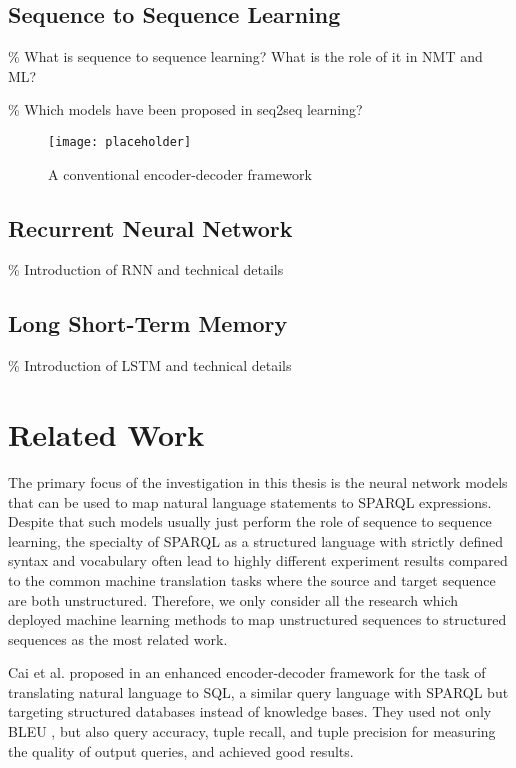\subsection{Sequence to Sequence Learning}
\% What is sequence to sequence learning? What is the role of it in NMT and ML?

\% Which models have been proposed in seq2seq learning?

\begin{figure}[h]
\texttt{[image: placeholder]}
\centering
\caption{A conventional encoder-decoder framework}
\label{figure:encoder-decoder}
\end{figure}

\subsection{Recurrent Neural Network} \label{subsection:rnn}
\% Introduction of RNN and technical details

\subsection{Long Short-Term Memory}
\% Introduction of LSTM and technical details

\section{Related Work} \label{section:related work}

The primary focus of the investigation in this thesis is the neural network models that can be used to map natural language statements to SPARQL expressions. Despite that such models usually just perform the role of sequence to sequence learning, the specialty of SPARQL as a structured language with strictly defined syntax and vocabulary often lead to highly different experiment results compared to the common machine translation tasks where the source and target sequence are both unstructured. Therefore, we only consider all the research which deployed machine learning methods to map unstructured sequences to structured sequences as the most related work.

Cai et al. proposed in \cite{Cai2017} an enhanced encoder-decoder framework for the task of translating natural language to SQL, a similar query language with SPARQL but targeting structured databases instead of knowledge bases. They used not only BLEU \cite{Papineni2002}, but also query accuracy, tuple recall, and tuple precision for measuring the quality of output queries, and achieved good results.

